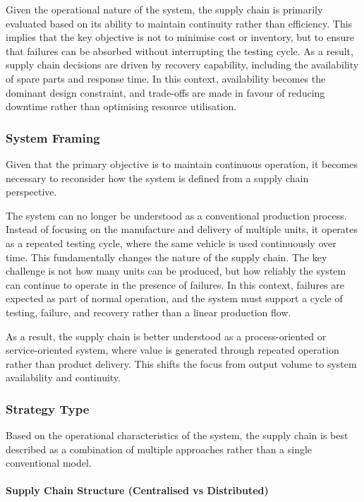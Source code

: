 \documentclass[a4paper,11pt]{article}
\begin{document}
Given the operational nature of the system, the supply chain is primarily evaluated based on its ability to maintain continuity rather than efficiency. This implies that the key objective is not to minimise cost or inventory, but to ensure that failures can be absorbed without interrupting the testing cycle. As a result, supply chain decisions are driven by recovery capability, including the availability of spare parts and response time. In this context, availability becomes the dominant design constraint, and trade-offs are made in favour of reducing downtime rather than optimising resource utilisation.

\subsubsection{System Framing}

Given that the primary objective is to maintain continuous operation, it becomes necessary to reconsider how the system is defined from a supply chain perspective.

The system can no longer be understood as a conventional production process. Instead of focusing on the manufacture and delivery of multiple units, it operates as a repeated testing cycle, where the same vehicle is used continuously over time. This fundamentally changes the nature of the supply chain. The key challenge is not how many units can be produced, but how reliably the system can continue to operate in the presence of failures. In this context, failures are expected as part of normal operation, and the system must support a cycle of testing, failure, and recovery rather than a linear production flow.

As a result, the supply chain is better understood as a process-oriented or service-oriented system, where value is generated through repeated operation rather than product delivery. This shifts the focus from output volume to system availability and continuity.

\subsubsection{Strategy Type}

Based on the operational characteristics of the system, the supply chain is best described as a combination of multiple approaches rather than a single conventional model.

\paragraph{Supply Chain Structure (Centralised vs Distributed)}
\end{document}
